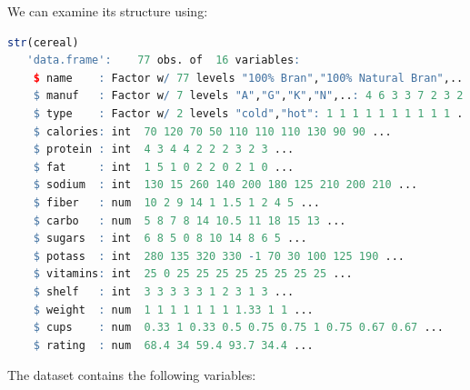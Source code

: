 \documentclass[
]{book}
\theoremstyle{definition}
\theoremstyle{definition}
\theoremstyle{definition}
\theoremstyle{definition}
\theoremstyle{remark}
\begin{document}
We can examine its structure using:

\begin{lstlisting}[language=R]
str(cereal)
   'data.frame':    77 obs. of  16 variables:
    $ name    : Factor w/ 77 levels "100% Bran","100% Natural Bran",..: 1 2 3 4 5 6 7 8 9 10 ...
    $ manuf   : Factor w/ 7 levels "A","G","K","N",..: 4 6 3 3 7 2 3 2 7 5 ...
    $ type    : Factor w/ 2 levels "cold","hot": 1 1 1 1 1 1 1 1 1 1 ...
    $ calories: int  70 120 70 50 110 110 110 130 90 90 ...
    $ protein : int  4 3 4 4 2 2 2 3 2 3 ...
    $ fat     : int  1 5 1 0 2 2 0 2 1 0 ...
    $ sodium  : int  130 15 260 140 200 180 125 210 200 210 ...
    $ fiber   : num  10 2 9 14 1 1.5 1 2 4 5 ...
    $ carbo   : num  5 8 7 8 14 10.5 11 18 15 13 ...
    $ sugars  : int  6 8 5 0 8 10 14 8 6 5 ...
    $ potass  : int  280 135 320 330 -1 70 30 100 125 190 ...
    $ vitamins: int  25 0 25 25 25 25 25 25 25 25 ...
    $ shelf   : int  3 3 3 3 3 1 2 3 1 3 ...
    $ weight  : num  1 1 1 1 1 1 1 1.33 1 1 ...
    $ cups    : num  0.33 1 0.33 0.5 0.75 0.75 1 0.75 0.67 0.67 ...
    $ rating  : num  68.4 34 59.4 93.7 34.4 ...
\end{lstlisting}

The dataset contains the following variables:
\end{document}
